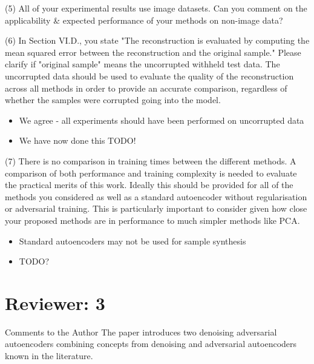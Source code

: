 \documentclass{article}
\begin{document}
{\color{blue}
(5) All of your experimental results use image datasets. Can you comment on the applicability \& expected performance of your methods on non-image data?}\newline

{\color{blue}
(6) In Section VI.D., you state "The reconstruction is evaluated by computing the mean squared error between the reconstruction and the original sample." Please clarify if "original sample" means the uncorrupted withheld test data. The uncorrupted data should be used to evaluate the quality of the reconstruction across all methods in order to provide an accurate comparison, regardless of whether the samples were corrupted going into the model.}\newline

\begin{itemize}
    \item We agree - all experiments should have been performed on uncorrupted data
    \item We have now done this TODO!
\end{itemize}

{\color{blue}
(7) There is no comparison in training times between the different methods. A comparison of both performance and training complexity is needed to evaluate the practical merits of this work. Ideally this should be provided for all of the methods you considered as well as a standard autoencoder without regularisation or adversarial training. This is particularly important to consider given how close your proposed methods are in performance to much simpler methods like PCA.}\newline

\begin{itemize}
    \item Standard autoencoders may not be used for sample synthesis
    \item TODO?
\end{itemize}

\section{Reviewer: 3}

Comments to the Author
The paper introduces two denoising adversarial autoencoders combining concepts from denoising and adversarial autoencoders known in the literature. 
\end{document}
